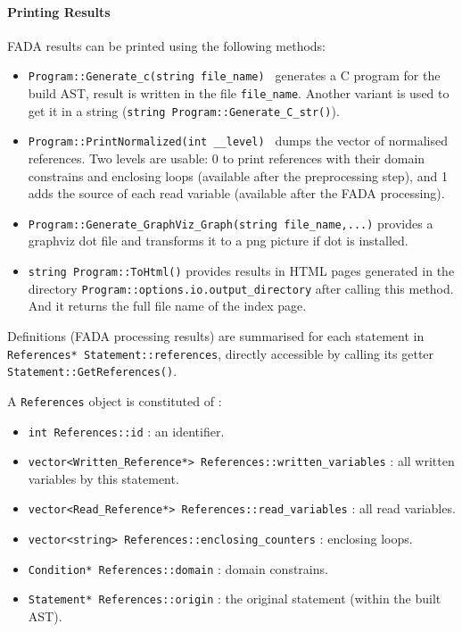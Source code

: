 \paragraph{Printing Results}
FADA results can be printed using the following methods:
\begin{itemize}
 \item \lstinline|Program::Generate_c(string file_name) | generates a C program for the build AST, result is written in the file \verb|file_name|. Another variant is used to get it in a string (\lstinline|string Program::Generate_C_str()|).
\item \lstinline|Program::PrintNormalized(int __level) | dumps the vector of normalised references. Two levels are usable: 0 to print references with their domain constrains and enclosing loops (available after the preprocessing step), and 1 adds the source of each read variable (available after the FADA processing).\\
\item \lstinline|Program::Generate_GraphViz_Graph(string file_name,...)|  provides a graphviz dot file and transforms it to a png picture if dot is installed.

\item \verb|string Program::ToHtml()|  provides results in HTML pages generated in the directory \verb|Program::options.io.output_directory| after calling this method. And it returns the full file name of the index page.\\
\end{itemize}



Definitions (FADA processing results) are summarised for each statement in \lstinline|References* Statement::references|, directly accessible by calling its getter \lstinline|Statement::GetReferences()|.

A \lstinline|References| object is constituted of :
\begin{itemize}
\item \lstinline|int References::id| : an identifier.
\item \lstinline|vector<Written_Reference*> References::written_variables| : all written variables by this statement.
\item \lstinline|vector<Read_Reference*> References::read_variables| : all read variables.
\item \lstinline|vector<string> References::enclosing_counters| : enclosing loops.
\item \lstinline|Condition* References::domain| : domain constrains.
\item \lstinline|Statement* References::origin| : the original statement (within the built AST).
\end{itemize}

